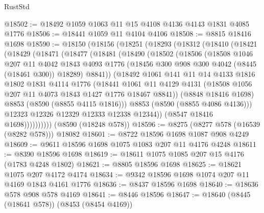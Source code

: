 \begin{lexlean}{RustStd}
\begin{coremodule}
@18502 := @18492 @1059 @1063 @11 @15 @4108 @4136 @4143 @1831 @4085 @1776
@18506 := @18441 @1059 @11 @4104 @4106
@18508 := @8815 @18416 @1698
@18590 := @18150
    (@18156
      (@18251
        (@18293
          (@18312
            (@18410
              (@18421
                (@18429
                  (@18471
                    (@18477
                      (@18481
                        (@18490
                          (@18502
                            (@18506
                              (@18508
                                @1046
                                @207
                                @11
                                @4042
                                @1843
                                @4093
                                @1776
                                (@18456 @300 @908 @300 @4042 (@8445 (@18461 @300)) @18289)
                                @8841))
                            (@18492
                              @1061
                              @141
                              @11
                              @14
                              @4133
                              @1816
                              @1802
                              @1831
                              @4114
                              @1776
                              (@18441
                                @1061
                                @11
                                @4129
                                @4131
                                (@18508 @1056 @207 @11 @4073 @1843 @1427 @1776 @18467 @8841))
                              (@8848 @18416 @1698)
                              @8853
                              (@8590 (@8855 @4115 @1816)))
                            @8853
                            (@8590 (@8855 @4086 @4136)))
                          @12323
                          @12326
                          @12329
                          @12333
                          @12338
                          @12344))
                      (@8547 @18416 @1698))))))))))
    (@8590 (@18248 @578))
@18596 := @8275 (@8277 @578 (@16539 (@8282 @578))) @18082
@18601 := @8722 @18596 @1698 @1087 @908 @4249
@18609 := @9611 @18596 @1698 @1075 @1083 @207 @11 @4176 @4248
@18611 := @8390 @18596 @1698
@18619 := @18611 @1075 @1085 @207 @15 @4176 (@1783 @4248 @1802)
@18621 := @8805 @18596 @1698
@18625 := @18621 @1075 @207 @4172 @4174
@18634 := @9342 @18596 @1698 @1074 @207 @11 @4169 @1843 @4161 @1776
@18636 := @8437 @18596 @1698
@18640 := @18636 @578 @908 @578 @4169
@18641 := @8446 @18596
@18647 := @18640 (@8445 (@18641 @578)) (@8453 (@8454 @4169))

\end{coremodule}
\end{lexlean}
